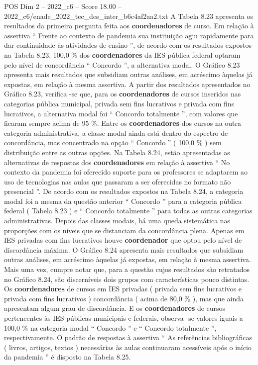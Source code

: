 \begin{textsample}{POS Dim 2 – 2022\_c6 – Score 18.00 – 2022\_c6/enade\_2022\_tec\_des\_inter\_b6c4af2aa2.txt}
A Tabela 8.23 apresenta os resultados da primeira pergunta feita aos \textbf{coordenadores} de curso.
Em relação à assertiva “ Frente ao contexto de pandemia sua instituição agiu rapidamente para dar continuidade às atividades de ensino ”, de acordo com os resultados expostos na Tabela 8.23, 100,0 \% dos \textbf{coordenadores} da IES pública federal optaram pelo nível de concordância “ Concordo ”, a alternativa modal.
O Gráfico 8.23 apresenta mais resultados que subsidiam outras análises, em acréscimo àquelas já expostas, em relação à mesma assertiva.
A partir dos resultados apresentados no Gráfico 8.23, verifica -se que, para os \textbf{coordenadores} de cursos inseridos nas categorias pública municipal, privada sem fins lucrativos e privada com fins lucrativos, a alternativa modal foi “ Concordo totalmente ”, com valores que ficaram sempre acima de 95 \%.
Entre os \textbf{coordenadores} dos cursos na outra categoria administrativa, a classe modal ainda está dentro do espectro de concordância, mas concentrado na opção “ Concordo ” ( 100,0 \% ) sem distribuição entre as outras opções.
Na Tabela 8.24, estão apresentadas as alternativas de respostas dos \textbf{coordenadores} em relação à assertiva “ No contexto da pandemia foi oferecido suporte para os professores se adaptarem ao uso de tecnologias nas aulas que passaram a ser oferecidas no formato não presencial ”.
De acordo com os resultados expostos na Tabela 8.24, a categoria modal foi a mesma da questão anterior “ Concordo ” para a categoria pública federal ( Tabela 8.23 ) e “ Concordo totalmente ” para todas as outras categorias administrativas.
Depois das classes modais, há uma queda sistemática nas proporções com os níveis que se distanciam da concordância plena.
Apenas em IES privadas com fins lucrativos houve \textbf{coordenador} que optou pelo nível de discordância máxima.
O Gráfico 8.24 apresenta mais resultados que subsidiam outras análises, em acréscimo àquelas já expostas, em relação à mesma assertiva.
Mais uma vez, cumpre notar que, para a questão cujos resultados são retratados no Gráfico 8.24, são discerníveis dois grupos com características pouco distintas.
Os \textbf{coordenadores} de cursos em IES privadas ( privada sem fins lucrativos e privada com fins lucrativos ) concordância ( acima de 80,0 \% ), mas que ainda apresentam algum grau de discordância.
E os \textbf{coordenadores} de cursos pertencentes às IES públicas municipais e federais, observa -se valores iguais a 100,0 \% na categoria modal “ Concordo ” e “ Concordo totalmente ”, respectivamente.
O padrão de respostas à assertiva “ As referências bibliográficas ( livros, artigos, textos ) necessárias às aulas continuaram acessíveis após o início da pandemia ” é disposto na Tabela 8.25.

\end{textsample}
